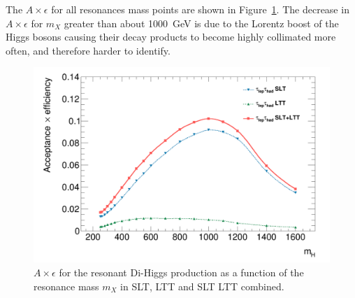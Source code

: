 The $A \times \epsilon$ for all resonances mass points are shown 
in Figure~\ref{fig:selection:acceptances}. 
The decrease in $A \times \epsilon$ 
for $m_X$ greater than about 1000~GeV is due to the Lorentz boost 
of the Higgs bosons causing their decay products to become highly collimated more often,
and therefore harder to identify.

\begin{figure}[htbp]
\centering
\includegraphics[width=0.85\linewidth]{DiHiggs/plots/FF_CRs/testacc.png}
\caption{$A \times \epsilon$ for the resonant Di-Higgs production
as a function of the resonance mass $m_X$ in
SLT, LTT and SLT LTT combined.}
\label{fig:selection:acceptances}
\end{figure}

